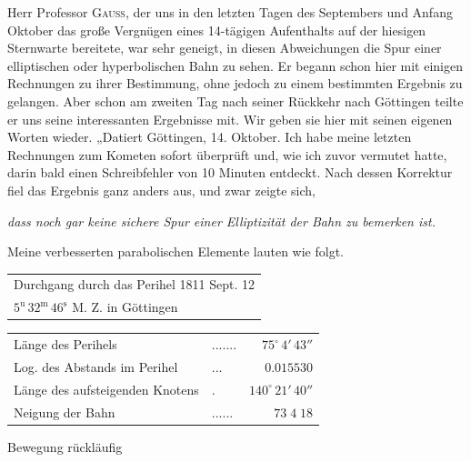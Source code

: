 \par\indent Herr Professor \textsc{Gauß}, der uns in den letzten Tagen des Septembers und Anfang Oktober das große Vergnügen eines 14-tägigen Aufenthalts auf der hiesigen Sternwarte bereitete, war sehr geneigt, in diesen Abweichungen die Spur einer elliptischen oder hyperbolischen Bahn zu sehen. Er begann schon hier mit einigen Rechnungen zu ihrer Bestimmung, ohne jedoch zu einem bestimmten Ergebnis zu gelangen. Aber schon am zweiten Tag nach seiner Rückkehr nach Göttingen teilte er uns seine interessanten Ergebnisse mit. Wir geben sie hier mit seinen eigenen Worten wieder. „Datiert Göttingen, 14. Oktober. Ich habe meine letzten Rechnungen zum Kometen sofort überprüft und, wie ich zuvor vermutet hatte, darin bald einen Schreibfehler von 10 Minuten entdeckt. Nach dessen Korrektur fiel das Ergebnis ganz anders aus, und zwar zeigte sich,

\begin{center}
\emph{dass noch gar keine sichere Spur einer Elliptizität der Bahn zu bemerken ist.}
\end{center}

\noindent Meine verbesserten parabolischen Elemente lauten wie folgt.

\begin{center}\fontsize{10}{12}\selectfont\setlength{\tabcolsep}{4pt}\renewcommand{\arraystretch}{1.15}\begin{tabular}{l}
Durchgang durch das Perihel 1811 Sept. 12\\
\quad $5^{\mathrm u}\,32^{\mathrm m}\,46^{\mathrm s}$ M. Z. in Göttingen\\
\end{tabular}\end{center}
\begin{center}\fontsize{10}{12}\selectfont\setlength{\tabcolsep}{3pt}\renewcommand{\arraystretch}{1.15}\begin{tabular}{llr}
Länge des Perihels & .\;.\;.\;.\;.\;.\;. & $75^\circ\,4'\,43''$\\
Log. des Abstands im Perihel & .\;.\;. & $0.015530$\\
Länge des aufsteigenden Knotens & . & $140^\circ\,21'\,40''$\\
Neigung der Bahn & .\;.\;.\;.\;.\;. & $73\;4\;18$\\
\end{tabular}\end{center}
\noindent Bewegung rückläufig

